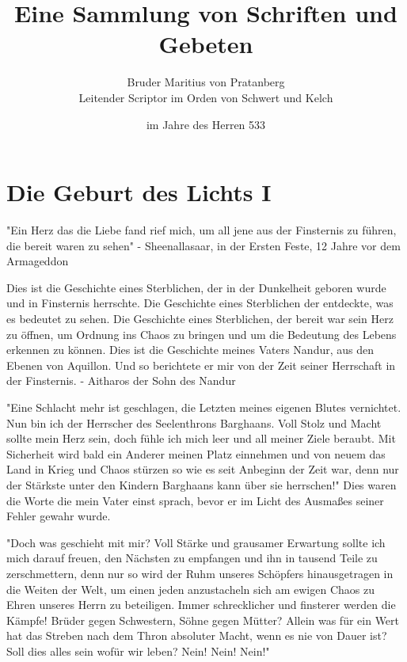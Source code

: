 \documentclass[14pt,twoside,BCOR=12mm,DIV=classic]{scrbook}
\begin{document}
\title{Eine Sammlung von Schriften und Gebeten}
\author{Bruder Maritius von Pratanberg\\Leitender Scriptor im Orden von Schwert und Kelch}
\date{im Jahre des Herren 533}

\maketitle
\tableofcontents

\chapter{Die Geburt des Lichts I}
"Ein Herz das die Liebe fand rief mich, um all jene aus der Finsternis zu führen,
die bereit waren zu sehen"
- Sheenallasaar, in der Ersten Feste, 12 Jahre vor dem Armageddon

Dies ist die Geschichte eines Sterblichen, der in der Dunkelheit geboren wurde
und in Finsternis herrschte. Die Geschichte eines Sterblichen der entdeckte, was
es bedeutet zu sehen. Die Geschichte eines Sterblichen, der bereit war sein
Herz zu öffnen, um Ordnung ins Chaos zu bringen und um die Bedeutung des
Lebens erkennen zu können. Dies ist die Geschichte meines Vaters Nandur, aus
den Ebenen von Aquillon. Und so berichtete er mir von der Zeit seiner
Herrschaft in der Finsternis.
- Aitharos der Sohn des Nandur

"Eine Schlacht mehr ist geschlagen, die Letzten meines eigenen Blutes
vernichtet. Nun bin ich der Herrscher des Seelenthrons Barghaans. Voll Stolz
und Macht sollte mein Herz sein, doch fühle ich mich leer und all meiner Ziele
beraubt. Mit Sicherheit wird bald ein Anderer meinen Platz einnehmen und von
neuem das Land in Krieg und Chaos stürzen so wie es seit Anbeginn der Zeit war,
denn nur der Stärkste unter den Kindern Barghaans kann über sie herrschen!" Dies
waren die Worte die mein Vater einst sprach, bevor er im Licht des Ausmaßes
seiner Fehler gewahr wurde.

"Doch was geschieht mit mir? Voll Stärke und grausamer Erwartung sollte ich mich
darauf freuen, den Nächsten zu empfangen und ihn in tausend Teile zu
zerschmettern, denn nur so wird der Ruhm unseres Schöpfers hinausgetragen in die
Weiten der Welt, um einen jeden anzustacheln sich am ewigen Chaos zu Ehren
unseres Herrn zu beteiligen. Immer schrecklicher und finsterer werden die
Kämpfe! Brüder gegen Schwestern, Söhne gegen Mütter? Allein was für ein Wert hat
das Streben nach dem Thron absoluter Macht, wenn es nie von Dauer ist?
Soll dies alles sein wofür wir leben?
Nein! Nein! Nein!"
\end{document}
